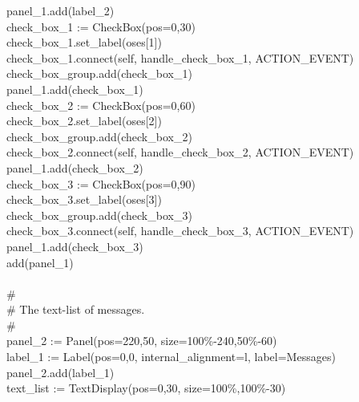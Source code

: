 {\>   \ \ \ panel\_1.add(label\_2) \\
\>   \ \ \ check\_box\_1 :=
CheckBox({\textquotedbl}pos=0,30{\textquotedbl}) \\
\>   \ \ \ check\_box\_1.set\_label(oses[1]) \\
\>   \ \ \ check\_box\_1.connect(self,
{\textquotedbl}handle\_check\_box\_1{\textquotedbl}, ACTION\_EVENT) \\
\>   \ \ \ check\_box\_group.add(check\_box\_1) \\
\>   \ \ \ panel\_1.add(check\_box\_1) \\
\>   \ \ \ check\_box\_2 :=
CheckBox({\textquotedbl}pos=0,60{\textquotedbl}) \\
\>   \ \ \ check\_box\_2.set\_label(oses[2]) \\
\>   \ \ \ check\_box\_group.add(check\_box\_2) \\
\>   \ \ \ check\_box\_2.connect(self,
{\textquotedbl}handle\_check\_box\_2{\textquotedbl}, ACTION\_EVENT) \\
\>   \ \ \ panel\_1.add(check\_box\_2) \\
\>   \ \ \ check\_box\_3 :=
CheckBox({\textquotedbl}pos=0,90{\textquotedbl}) \\
\>   \ \ \ check\_box\_3.set\_label(oses[3]) \\
\>   \ \ \ check\_box\_group.add(check\_box\_3) \\
\>   \ \ \ check\_box\_3.connect(self,
{\textquotedbl}handle\_check\_box\_3{\textquotedbl}, ACTION\_EVENT) \\
\>   \ \ \ panel\_1.add(check\_box\_3) \\
\>   \ \ \ add(panel\_1) \\
\ \\
\>   \ \ \ \# \\
\>   \ \ \ \# The text-list of messages. \\
\>   \ \ \ \# \\
\>   \ \ \ panel\_2 := Panel({\textquotedbl}pos=220,50{\textquotedbl},
{\textquotedbl}size=100\%-240,50\%-60{\textquotedbl}) \\
\>   \ \ \ label\_1 := Label({\textquotedbl}pos=0,0{\textquotedbl},
{\textquotedbl}internal\_alignment=l{\textquotedbl},
{\textquotedbl}label=Messages{\textquotedbl}) \\
\>   \ \ \ panel\_2.add(label\_1) \\
\>   \ \ \ text\_list :=
TextDisplay({\textquotedbl}pos=0,30{\textquotedbl},
{\textquotedbl}size=100\%,100\%-30{\textquotedbl}) \\
}
